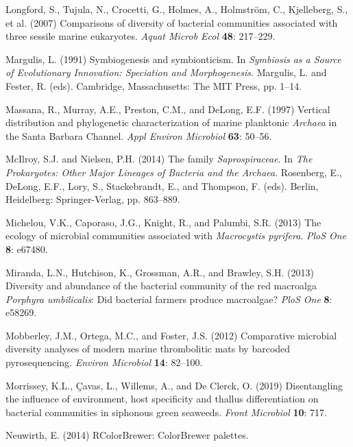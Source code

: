 \documentclass[12pt,]{article}
\begin{document}
\leavevmode\hypertarget{ref-Longford2007}{}%
Longford, S., Tujula, N., Crocetti, G., Holmes, A., Holmström, C.,
Kjelleberg, S., et al. (2007) Comparisons of diversity of bacterial
communities associated with three sessile marine eukaryotes. \emph{Aquat
Microb Ecol} \textbf{48}: 217--229.

\leavevmode\hypertarget{ref-Margulis1991}{}%
Margulis, L. (1991) Symbiogenesis and symbionticism. In \emph{Symbiosis
as a Source of Evolutionary Innovation: Speciation and Morphogenesis}.
Margulis, L. and Fester, R. (eds). Cambridge, Massachusetts: The MIT
Press, pp. 1--14.

\leavevmode\hypertarget{ref-Massana1997}{}%
Massana, R., Murray, A.E., Preston, C.M., and DeLong, E.F. (1997)
Vertical distribution and phylogenetic characterization of marine
planktonic \emph{Archaea} in the Santa Barbara Channel. \emph{Appl
Environ Microbiol} \textbf{63}: 50--56.

\leavevmode\hypertarget{ref-McIlroy2014}{}%
McIlroy, S.J. and Nielsen, P.H. (2014) The family \emph{Saprospiraceae}.
In \emph{The Prokaryotes: Other Major Lineages of Bacteria and the
Archaea}. Rosenberg, E., DeLong, E.F., Lory, S., Stackebrandt, E., and
Thompson, F. (eds). Berlin, Heidelberg: Springer-Verlag, pp. 863--889.

\leavevmode\hypertarget{ref-Michelou2013}{}%
Michelou, V.K., Caporaso, J.G., Knight, R., and Palumbi, S.R. (2013) The
ecology of microbial communities associated with \emph{Macrocystis
pyrifera}. \emph{PloS One} \textbf{8}: e67480.

\leavevmode\hypertarget{ref-Miranda2013}{}%
Miranda, L.N., Hutchison, K., Grossman, A.R., and Brawley, S.H. (2013)
Diversity and abundance of the bacterial community of the red macroalga
\emph{Porphyra umbilicalis}: Did bacterial farmers produce macroalgae?
\emph{PloS One} \textbf{8}: e58269.

\leavevmode\hypertarget{ref-Mobberley2012}{}%
Mobberley, J.M., Ortega, M.C., and Foster, J.S. (2012) Comparative
microbial diversity analyses of modern marine thrombolitic mats by
barcoded pyrosequencing. \emph{Environ Microbiol} \textbf{14}: 82--100.

\leavevmode\hypertarget{ref-Morrissey2019}{}%
Morrissey, K.L., Çavas, L., Willems, A., and De Clerck, O. (2019)
Disentangling the influence of environment, host specificity and thallus
differentiation on bacterial communities in siphonous green seaweeds.
\emph{Front Microbiol} \textbf{10}: 717.

\leavevmode\hypertarget{ref-Neuwirth2014}{}%
Neuwirth, E. (2014) RColorBrewer: ColorBrewer palettes.
\end{document}
